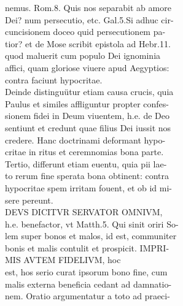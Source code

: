\documentclass{article}
\begin{document}
\begin{pages}
                nemus. Rom.8. Quis nos separabit ab amore \\
                Dei? num persecutio, etc. Gal.5.Si adhuc cir- \\
                cuncisionem doceo quid persecutionem pa- \\
                tior? et de Mose scribit epistola ad Hebr.11. \\
                quod maluerit cum populo Dei ignominia \\
                affici, quam gloriose viuere apud Aegyptios: \\
                contra faciunt hypocritae. \\
                Deinde distinguütur etiam causa crucis, quia \\
                Paulus et similes affliguntur propter confes- \\
                sionem fidei in Deum viuentem, h.e. de Deo \\
                sentiunt et credunt quae filius Dei iussit nos \\
                credere. Hanc doctrinami deformant hypo- \\
                critae in ritus et ceremnomias bona parte. \\
                Tertio, differunt etiam euentu, quia pii lae- \\
                to rerum fine sperata bona obtinent: contra \\
                hypocritae spem irritam fouent, et ob id mi- \\
                sere pereunt. \\
                DEVS DICITVR SERVATOR OMNIVM, \\
                h.e. benefactor, vt Matth.5. Qui sinit oriri So- \\
                lem super bonos et malos, id est, communiter \\
                bonis et malis contulit et prospicit. IMPRI- \\
                MIS AVTEM FIDELIVM, hoc \\
                est, hos serio curat ipsorum bono fine, cum \\
                malis externa beneficia cedant ad damnatio- \\
                nem. Oratio argumentatur a toto ad praeci- \\

\end{pages}
\end{document}
